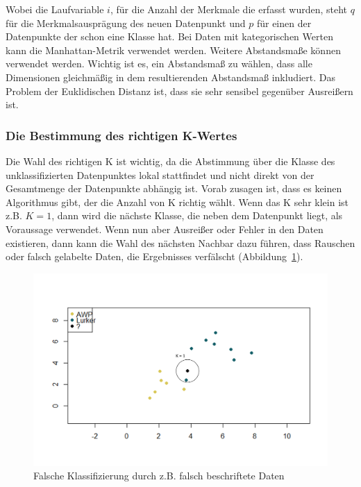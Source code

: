 \documentclass[envcountsame, envcountchap, deutsch]{i-studis}
\begin{document}
Wobei die Laufvariable $i$, für die Anzahl der Merkmale die erfasst wurden, steht $q$ für die Merkmalsausprägung des neuen Datenpunkt und $p$ für einen der Datenpunkte der schon eine Klasse hat. Bei Daten mit kategorischen Werten kann die Manhattan-Metrik verwendet werden. 
Weitere Abstandsmaße können verwendet werden. Wichtig ist es, ein Abstandsmaß zu wählen, dass alle Dimensionen gleichmäßig in dem resultierenden 
Abstandsmaß inkludiert. Das Problem der Euklidischen Distanz ist, dass sie sehr sensibel gegenüber Ausreißern ist.
\subsubsection{Die Bestimmung des richtigen K-Wertes}
Die Wahl des richtigen K ist wichtig, da die Abstimmung über die Klasse des unklassifizierten Datenpunktes lokal stattfindet und nicht direkt von der Gesamtmenge der Datenpunkte abhängig ist. Vorab zusagen ist, dass 
es keinen Algorithmus gibt, der die Anzahl von K richtig wählt. Wenn das K sehr klein ist z.B. $K = 1$, dann wird die nächste Klasse, die neben 
dem Datenpunkt liegt, als Voraussage verwendet.
Wenn nun aber Ausreißer oder Fehler in den Daten existieren, dann kann die Wahl des nächsten Nachbar dazu führen, 
dass Rauschen oder falsch gelabelte Daten, die Ergebnisses verfälscht (Abbildung~\ref{fig:knn_wrong_label}).  

\vspace{1ex}
\begin{figure}
    \includegraphics[width=\textwidth]{knn_wrong_label_circled.png}
    \caption{Falsche Klassifizierung durch z.B. falsch beschriftete Daten}\label{fig:knn_wrong_label}
\end{figure}
\end{document}
